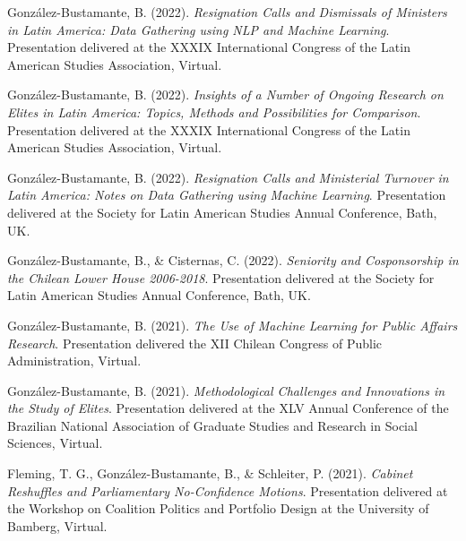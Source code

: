 \begin{publications}
\begin{benumerate}{72}
\item{\small González-Bustamante, B. (2022). {\itshape Resignation Calls and Dismissals of Ministers in Latin America: Data Gathering using NLP and Machine Learning}. Presentation delivered at the XXXIX International Congress of the Latin American Studies Association, Virtual.}\vspace{1mm}

\item{\small González-Bustamante, B. (2022). {\itshape Insights of a Number of Ongoing Research on Elites in Latin America: Topics, Methods and Possibilities for Comparison}. Presentation delivered at the XXXIX International Congress of the Latin American Studies Association, Virtual.}\vspace{1mm}

\item{\small González-Bustamante, B. (2022). {\itshape Resignation Calls and Ministerial Turnover in Latin America: Notes on Data Gathering using Machine Learning}. Presentation delivered at the Society for Latin American Studies Annual Conference, Bath, UK.}\vspace{1mm}

\item{\small González-Bustamante, B., \& Cisternas, C. (2022). {\itshape Seniority and Cosponsorship in the Chilean Lower House 2006-2018}. Presentation delivered at the Society for Latin American Studies Annual Conference, Bath, UK.}\vspace{1mm}

\item{\small González-Bustamante, B. (2021). {\itshape The Use of Machine Learning for Public Affairs Research}. Presentation delivered the XII Chilean Congress of Public Administration, Virtual.}\vspace{1mm}

\item{\small González-Bustamante, B. (2021). {\itshape Methodological Challenges and Innovations in the Study of Elites}. Presentation delivered at the XLV Annual Conference of the Brazilian National Association of Graduate Studies and Research in Social Sciences, Virtual.}\vspace{1mm}

\item{\small Fleming, T. G., González-Bustamante, B., \& Schleiter, P. (2021). {\itshape Cabinet Reshuffles and Parliamentary No-Confidence Motions}. Presentation delivered at the Workshop on Coalition Politics and Portfolio Design at the University of Bamberg, Virtual.}\vspace{1mm}


\end{benumerate}
\end{publications}
